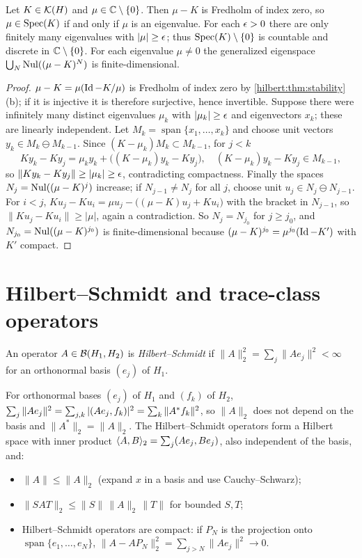 \begin{theorem}\label{hilbert:thm:riesz}
Let $K\in\mathcal{K}(H)$ and $\mu\in\mathbb{C}\setminus\{0\}$. Then $\mu-K$ is Fredholm of index zero, so $\mu\in\operatorname{Spec}(K)$
if and only if $\mu$ is an eigenvalue. For each $\epsilon>0$ there are only finitely many
eigenvalues with $|\mu|\ge\epsilon$; thus $\operatorname{Spec}(K)\setminus\{0\}$ is countable and discrete in
$\mathbb{C}\setminus\{0\}$. For each eigenvalue $\mu\ne0$ the generalized eigenspace
$\bigcup_N\operatorname{Nul}((\mu-K)^N)$ is finite-dimensional.
\end{theorem}
\begin{proof}
$\mu-K=\mu(\operatorname{Id}-K/\mu)$ is Fredholm of index zero by \cref{hilbert:thm:stability}(b); if it is
injective it is therefore surjective, hence invertible. Suppose there were infinitely
many distinct eigenvalues $\mu_k$ with $|\mu_k|\ge\epsilon$ and eigenvectors $x_k$; these are linearly
independent. Let $M_k=\operatorname{span}\{x_1,\dots,x_k\}$ and choose unit vectors $y_k\in M_k\ominus M_{k-1}$.
Since $(K-\mu_k)M_k\subset M_{k-1}$, for $j<k$
\begin{equation*}
Ky_k-Ky_j=\mu_ky_k+\big((K-\mu_k)y_k-Ky_j\big),\quad (K-\mu_k)y_k-Ky_j\in M_{k-1},
\end{equation*}
so $\|Ky_k-Ky_j\|\ge|\mu_k|\ge\epsilon$, contradicting compactness. Finally the spaces
$N_j=\operatorname{Nul}((\mu-K)^j)$ increase; if $N_{j-1}\ne N_j$ for all $j$, choose unit $u_j\in N_j\ominus N_{j-1}$.
For $i<j$, $Ku_j-Ku_i=\mu u_j-\big((\mu-K)u_j+Ku_i\big)$ with the bracket in $N_{j-1}$, so
$\|Ku_j-Ku_i\|\ge|\mu|$, again a contradiction. So $N_j=N_{j_0}$ for $j\ge j_0$, and
$N_{j_0}=\operatorname{Nul}((\mu-K)^{j_0})$ is finite-dimensional because $(\mu-K)^{j_0}=\mu^{j_0}(\operatorname{Id}-K')$ with $K'$
compact.
\end{proof}

\section{Hilbert--Schmidt and trace-class operators}\label{hilbert:sec:trace}

\begin{definition}\label{hilbert:def:HS}
An operator $A\in\mathcal{B}(H_1,H_2)$ is \emph{Hilbert--Schmidt} if
$\|A\|_2^2=\sum_j\|Ae_j\|^2<\infty$ for an orthonormal basis $(e_j)$ of $H_1$.
\end{definition}

For orthonormal bases $(e_j)$ of $H_1$ and $(f_k)$ of $H_2$,
$\sum_j\|Ae_j\|^2=\sum_{j,k}|( Ae_j, f_k)|^2=\sum_k\|A^*f_k\|^2$, so $\|A\|_2$ does not depend on the
basis and $\|A^*\|_2=\|A\|_2$. The Hilbert--Schmidt operators form a Hilbert space with inner
product $\langle A,B\rangle_2=\sum_j( Ae_j, Be_j)$, also independent of the basis, and:
\begin{itemize}
\item $\|A\|\le\|A\|_2$ (expand $x$ in a basis and use Cauchy--Schwarz);
\item $\|SAT\|_2\le\|S\|\,\|A\|_2\,\|T\|$ for bounded $S,T$;
\item Hilbert--Schmidt operators are compact: if $P_N$ is the projection onto
$\operatorname{span}\{e_1,\dots,e_N\}$, $\|A-AP_N\|_2^2=\sum_{j>N}\|Ae_j\|^2\to0$.
\end{itemize}

